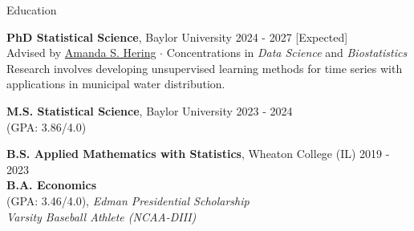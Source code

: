 \documentclass{resume} %
\begin{document}
\footnotesize








\begin{rSection}{Education}

{\bf PhD Statistical Science}, Baylor University \hfill {2024 - 2027 [Expected]}\\
Advised by \href{https://statistics.artsandsciences.baylor.edu/person/dr-amanda-s-hering}{Amanda S. Hering} $\cdot$ Concentrations in \textit{Data Science} and \textit{Biostatistics} \\
Research involves developing unsupervised learning methods for time series with applications in municipal water distribution.

{\bf M.S. Statistical Science}, Baylor University \hfill {2023 - 2024}\\
(GPA: 3.86/4.0)

{\bf B.S. Applied Mathematics with Statistics}, Wheaton College (IL) \hfill {2019 - 2023}\\
{\bf B.A. Economics}\\
(GPA: 3.46/4.0), \textit{Edman Presidential Scholarship}\\
\textit{Varsity Baseball Athlete (NCAA-DIII)}

\end{rSection}



\end{document}
